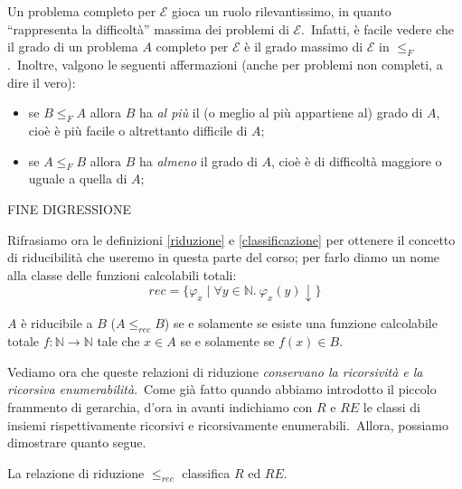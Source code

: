 \noindent Un problema completo per $\mathcal{E}$ gioca un ruolo rilevantissimo, in quanto ``rappresenta la difficoltà'' massima dei problemi di $\mathcal{E}$.\
Infatti, è facile vedere che il grado di un problema $A$ completo per $\mathcal{E}$ è il grado massimo di $\mathcal{E}$ in $\leqslant_F$.\
Inoltre, valgono le seguenti affermazioni (anche per problemi non completi, a dire il vero):
\begin{itemize}
    \item se $B \leqslant_F A$ allora $B$ ha \textit{al più} il (o meglio al più appartiene al) grado di $A$, cioè è più facile o altrettanto difficile di $A$;
    \item se $A \leqslant_F B$ allora $B$ ha \textit{almeno} il grado di $A$, cioè è di difficoltà maggiore o uguale a quella di $A$;
\end{itemize}

\noindent\hrulefill

\noindent\hrulefill FINE DIGRESSIONE\hrulefill

\vspace{24pt}

\noindent Rifrasiamo ora le definizioni \ref{riduzione} e \ref{classificazione} per ottenere il concetto di riducibilità che useremo in questa parte del corso; per farlo diamo un nome alla classe delle funzioni calcolabili totali:
\[\mathit{rec} = \{\varphi_x \mid \forall y \in \mathbb{N}.\ \varphi_x(y) \downarrow\}\]

\begin{definition}
    $A$ è riducibile a $B$ ($A \leqslant_{rec} B$) se e solamente se esiste una funzione calcolabile totale $f: \mathbb{N} \rightarrow \mathbb{N}$ tale che $x \in A$ se e solamente se $f(x) \in B$.
\end{definition}

\noindent Vediamo ora che queste relazioni di riduzione \textit{conservano la ricorsività e la ricorsiva enumerabilità}.\
Come già fatto quando abbiamo introdotto il piccolo frammento di gerarchia, d'ora in avanti indichiamo con $R$ e $RE$ le classi di insiemi rispettivamente ricorsivi e ricorsivamente enumerabili.\
Allora, possiamo dimostrare quanto segue.

\begin{theorem}
    La relazione di riduzione $\leqslant_{rec}$ classifica $R$ ed $RE$.
\end{theorem}

